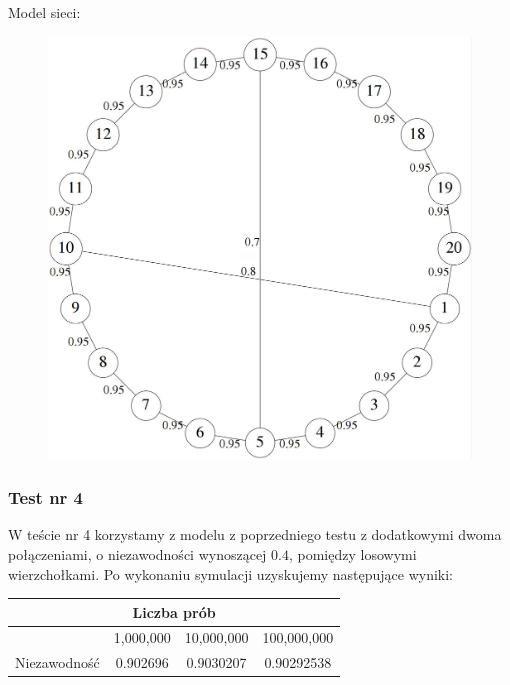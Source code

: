 \documentclass[titlepage]{article}
\begin{document}
\noindent Model sieci:
\begin{figure}[h!]
	\centering
	\includegraphics[width=0.8\linewidth]{graph3.jpg}
\end{figure}

\newpage
\subsubsection{Test nr 4}
W teście nr 4 korzystamy z modelu z poprzedniego testu z dodatkowymi dwoma połączeniami, o niezawodności wynoszącej $0.4$, pomiędzy losowymi wierzchołkami. Po wykonaniu symulacji uzyskujemy następujące wyniki:
\begin{table}[h!]
	\centering
    \label{tab:table1}
    \begin{tabular}{|c|c|c|c|}
    		\multicolumn{4}{c}{Liczba prób}\\
    		\hline
      	& 1,000,000 & 10,000,000 & 100,000,000\\
      	\hline
      	Niezawodność & 0.902696 & 0.9030207 & 0.90292538\\
		\hline
    \end{tabular}
\end{table}
\end{document}
